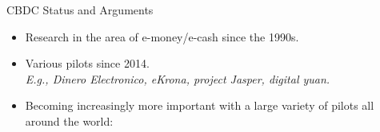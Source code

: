 \documentclass[handout]{beamer}
\begin{document}
\begin{frame}{CBDC Status and Arguments}

\begin{itemize}
	\item Research in the area of e-money/e-cash since the 1990s.
	\item Various pilots since 2014.\\
			\textit{E.g., Dinero Electronico, eKrona, project Jasper, digital yuan.}
	\item Becoming increasingly more important with a large variety of pilots all around the world: 
\end{itemize}

\vspace{1.0em}

\end{frame}
\end{document}
